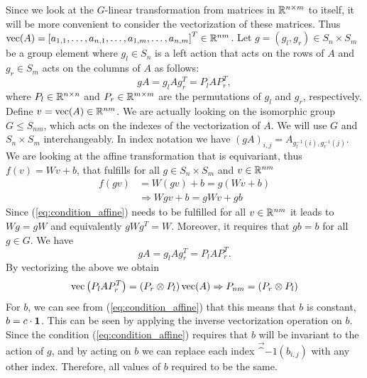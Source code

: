 \documentclass[english]{article}
\begin{document}
\subsection{~}

\label{subsec:q21}


Since we look at the $G$-linear transformation from matrices in $\RF^{n\times m}$
to itself, it will be more convenient to consider the vectorization
of these matrices. Thus $\vec(A)=\left[a_{1,1},\ldots,a_{n,1},\ldots,a_{1,m},\ldots,a_{n,m}\right]^T\in\RF^{nm}$.
Let $g=\left(g_l,g_r\right)\in S_n\times S_{m}$ be a group
element where $g_l\in S_n$ is a left action that acts on the
rows of $A$ and $g_r\in S_{m}$ acts on the columns of $A$ as
follows: 
\begin{equation}
gA=g_lAg_r^T
=
P_lAP_r^T
,
\label{eq:groupAction}
\end{equation}
where $P_l\in\RF^{n\times n}$ and $P_r\in\RF^{m\times m}$ are
the permutations of $g_l$ and $g_r$, respectively. Define $v=\vec(A)\in\RF^{nm}$. 
We are actually looking on the isomorphic group $G \leq S_{nm}$, which acts on the indexes of the vectorization of $A$. We will use $G$ and $S_n \times S_m$ interchangeably.
In index notation we have $\left(gA\right)_{i,j}=A_{g_l^{-1}(i),g_r^{-1}(j)}$.
We are looking at the affine transformation that is equivariant, thus
$f(v)=Wv+b$, that fulfills for all $g\in S_n\times S_{m}$ and
$v\in\RF^{nm}$
\begin{align}
f(gv) 
&=
W\left(gv\right)+b=g\left(Wv+b\right)\nonumber \\
&
\Rightarrow Wgv+b=gWv+gb\label{eq:condition_affine}
\end{align}
Since (\ref{eq:condition_affine}) needs to be fulfilled for all $v\in\RF^{nm}$
it leads to $Wg=gW$ and equivalently $gWg^T=W$. Moreover, it requires
that $gb=b$ for all $g\in G$. 
We have 
\begin{equation}
gA=g_lAg_r^T=P_lAP_r^T.
\end{equation}
By vectorizing the above we obtain 
\begin{equation}
\vec\left(P_lAP_r^T\right)
=
\left(P_r\otimes P_l\right)\vec(A)
\Rightarrow
P_{nm} = \left(P_r\otimes P_l\right)
\end{equation}
For $b$, we can see from (\ref{eq:condition_affine}) that this means
that $b$ is constant, $b = c\cdot \oneb $. This can be seen by applying the inverse vectorization operation on $b$.
Since the condition (\ref{eq:condition_affine}) requires that $b$ will be invariant to the action of $g$, and by acting on $b$ we can replace each index $\vec^{-1}(b_{i,j})$ with any other index.
Therefore, all values of $b$ required to be the same.
\end{document}
